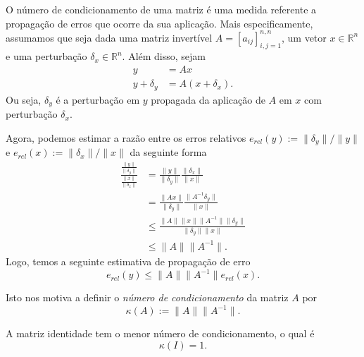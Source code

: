 O número de condicionamento de uma matriz é uma medida referente a propagação de erros que ocorre da sua aplicação. Mais especificamente, assumamos que seja dada uma matriz invertível $A = [a_{ij}]_{i,j=1}^{n,n}$, um vetor $x\in\mathbb{R}^n$ e uma perturbação $\delta_x\in\mathbb{R}^n$. Além disso, sejam
\begin{align}
  y &= Ax\\
  y + \delta_y &= A(x+\delta_x).
\end{align}
Ou seja, $\delta_y$ é a perturbação em $y$ propagada da aplicação de $A$ em $x$ com perturbação $\delta_x$.

Agora, podemos estimar a razão entre os erros relativos $e_{rel}(y) := \|\delta_y\|/\|y\|$ e $e_{rel}(x) := \|\delta_x\|/\|x\|$ da seguinte forma 
\begin{align}
  \frac{\frac{\|y\|}{\|\delta_y\|}}{\frac{\|x\|}{\|\delta_x\|}} &= \frac{\|y\|}{\|\delta_y\|}\frac{\|\delta_x\|}{\|x\|}\\
  &=\frac{\|Ax\|}{\|\delta_y\|}\frac{\|A^{-1}\delta_y\|}{\|x\|} \\
  &\leq \frac{\|A\|\|x\|\|A^{-1}\|\|\delta_y\|}{\|\delta_y\|\|x\|}\\
  &\leq \|A\|\|A^{-1}\|.
\end{align}
Logo, temos a seguinte estimativa de propagação de erro
\begin{equation}
  e_{rel}(y) \leq \|A\|\|A^{-1}\|e_{rel}(x).
\end{equation}

Isto nos motiva a definir o \emph{número de condicionamento} da matriz $A$ por
\begin{equation}
  \kappa(A) := \|A\|\|A^{-1}\|.
\end{equation}

\begin{obs}
  A matriz identidade tem o menor número de condicionamento, o qual é
  \begin{equation}
    \kappa(I) = 1.
  \end{equation}
\end{obs}

